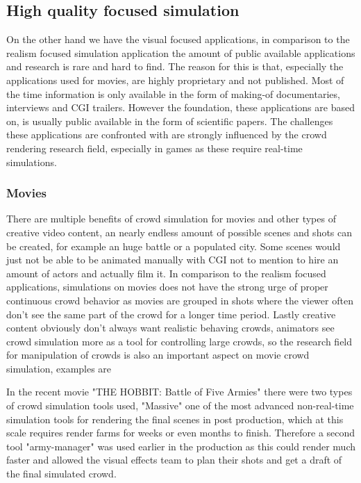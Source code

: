 \documentclass{acmsiggraph}               %
\begin{document}
\subsection{High quality focused simulation}

On the other hand we have the visual focused applications, in comparison to the realism focused simulation application the amount of public available applications and research is rare and hard to find. The reason for this is that, especially the applications used for movies, are highly proprietary and not published. Most of the time information is only available in the form of making-of documentaries, interviews and CGI trailers. 
However the foundation, these applications are based on, is usually public available in the form of scientific papers. The challenges these applications are confronted with are strongly influenced by the crowd rendering research field, especially in games as these require real-time simulations. \cite{thalmann_crowd_2013}

\subsubsection{Movies}

There are multiple benefits of crowd simulation for movies and other types of creative video content, an nearly endless amount of possible scenes and shots can be created, for example an huge battle or a populated city. Some scenes would just not be able to be animated manually with CGI not to mention to hire an amount of actors and actually film it. In comparison to the realism focused applications, simulations on movies does not have the strong urge of proper continuous crowd behavior as movies are grouped in shots where the viewer often don't see the same part of the crowd for a longer time period. Lastly creative content obviously don't always want realistic behaving crowds, animators see crowd simulation more as a tool for controlling large crowds, so the research field for manipulation of crowds is also an important aspect on movie crowd simulation,  examples are \cite{kim_interactive_2014} \cite{ulicny_crowdbrush_2004}

In the recent movie "THE HOBBIT: Battle of Five Armies" there were  two types of crowd simulation tools used, "Massive" one of the most advanced non-real-time simulation tools \cite{massive_website} for rendering the final scenes in post production, which at this scale requires render farms for weeks or even months to finish. Therefore a second tool "army-manager" was used earlier in the production as this could render much faster and allowed the visual effects team to plan their shots and get a draft of the final simulated crowd. \cite{wired_hobbit_doku}
\end{document}
